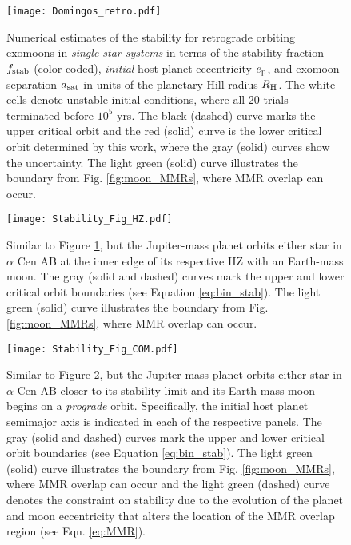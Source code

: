 \documentclass[preprint]{aastex63}
\begin{document}
\begin{figure}
	\texttt{[image: Domingos\_retro.pdf]}
    \caption{Numerical estimates of the stability for retrograde orbiting exomoons in \emph{single star systems} in terms of the stability fraction $f_{\rm stab}$ (color-coded), \textit{initial} host planet eccentricity $e_{\rm p}$, and exomoon separation $a_{\rm sat}$ in units of the planetary Hill radius $R_{\rm H}$.  The white cells denote unstable initial conditions, where all 20 trials terminated before $10^5$ yrs.  The black (dashed) curve marks the upper critical orbit \citep[][; DWY06]{Domingos2006} and the red (solid) curve is the lower critical orbit determined by this work, where the gray (solid) curves show the uncertainty.  The light green (solid) curve illustrates the boundary from Fig. \ref{fig:moon_MMRs}, where MMR overlap can occur.  }
    \label{fig:moon_retro}
\end{figure}

\begin{figure}

	\texttt{[image: Stability\_Fig\_HZ.pdf]}
    \caption{Similar to Figure \ref{fig:moon_retro}, but the Jupiter-mass planet orbits either star in $\alpha$ Cen AB at the inner edge of its respective HZ with an Earth-mass moon. The gray (solid and dashed) curves mark the upper and lower critical orbit boundaries (see Equation \ref{eq:bin_stab}).  The light green (solid) curve illustrates the boundary from Fig. \ref{fig:moon_MMRs}, where MMR overlap can occur.}
    \label{fig:moon_hz}
\end{figure}



\begin{figure}
	\texttt{[image: Stability\_Fig\_COM.pdf]}
    \caption{Similar to Figure \ref{fig:moon_hz}, but the Jupiter-mass planet orbits either star in $\alpha$ Cen AB closer to its stability limit and its Earth-mass moon begins on a \textit{prograde} orbit. Specifically, the initial host planet semimajor axis is indicated in each of the respective panels. The gray (solid and dashed) curves mark the upper and lower critical orbit boundaries (see Equation \ref{eq:bin_stab}).  The light green (solid) curve illustrates the boundary from Fig. \ref{fig:moon_MMRs}, where MMR overlap can occur and the light green (dashed) curve denotes the constraint on stability due to {the evolution of the planet and moon eccentricity that alters the location of the MMR overlap region (see Eqn. \ref{eq:MMR})}.}
    \label{fig:moon_bin_stab}
\end{figure}
\end{document}
